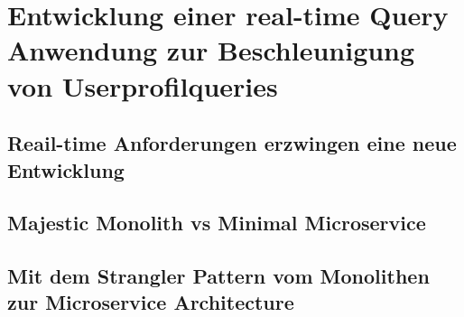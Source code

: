 \chapter{Entwicklung einer real-time Query Anwendung zur Beschleunigung von Userprofilqueries}

\section{Reail-time Anforderungen erzwingen eine neue Entwicklung}

\section{Majestic Monolith vs Minimal Microservice}

\section{Mit dem Strangler Pattern vom Monolithen zur Microservice Architecture}